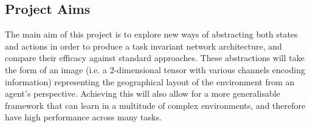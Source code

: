 \subsection{Project Aims}

The main aim of this project is to explore new ways of abstracting both states and actions in order to produce a task invariant network architecture, and compare their efficacy against standard approaches. These abstractions will take the form of an image (i.e. a 2-dimensional tensor with various channels encoding information) representing the geographical layout of the environment from an agent's perspective. Achieving this will also allow for a more generalisable framework that can learn in a multitude of complex environments, and therefore have high performance across many tasks. 


